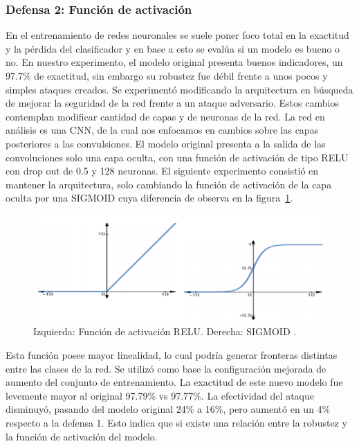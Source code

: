 \subsubsection{Defensa 2: Función de activación}

En el entrenamiento de redes neuronales se suele poner foco total en la exactitud y la pérdida del clasificador y en base a esto se evalúa si un modelo es bueno o no. En nuestro experimento, el modelo original presenta buenos indicadores, un 97.7\% de exactitud, sin embargo su robustez fue débil frente a unos pocos y simples ataques creados. Se experimentó modificando la arquitectura en búsqueda de mejorar la seguridad de la red frente a un ataque adversario. Estos cambios contemplan modificar cantidad de capas  y de neuronas de la red. La red en análisis es una CNN, de la cual nos enfocamos en cambios sobre las capas posteriores a las convulsiones.
El modelo original presenta a la salida de las convoluciones solo una capa oculta, con una función de activación de tipo RELU con drop out de 0.5 y 128 neuronas. El siguiente experimento consistió en mantener la arquitectura, solo cambiando la función de activación de la capa oculta por una SIGMOID cuya diferencia de observa en la figura~\ref{fig:64}.

 \begin{figure}[!h]
    \centering
    \includegraphics[scale = 1]{Figures/figura_64.PNG}
    \decoRule
    \caption[Función de activación]{Izquierda: Función de activación RELU. Derecha: SIGMOID \parencite{r62}.}
    \label{fig:64}
\end{figure}

Esta función posee mayor linealidad, lo cual podría generar fronteras distintas entre las clases de la red. Se utilizó como base la configuración mejorada de aumento del conjunto de entrenamiento. La exactitud de este nuevo modelo fue levemente mayor al original 97.79\% vs 97.77\%. La efectividad del ataque disminuyó, pasando del modelo original 24\% a  16\%, pero aumentó en un 4\% respecto a la defensa 1. Esto indica que si existe una relación entre la robustez y la función de activación del modelo.




